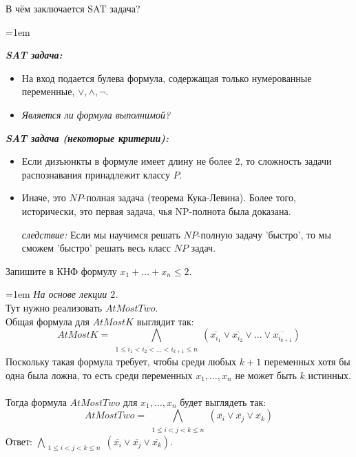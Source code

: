 \documentclass[12pt]{extreport}
\theoremstyle{definiton}
\theoremstyle{definition}
\theoremstyle{definition}
\let\leq\leqslant
\newcommand{\solution}[2][\color{myblue}Ответ]{
\medskip
	\noindent{\bfseries #1 }{{\color{myblue}\bfseries #2:}}
}
\newenvironment{blockquote}{%
  \par%
  \medskip
  \leftskip=1em%
  \noindent}{%
  \par\medskip}
\begin{document}
\Pr[\textcolor{mygreen}{Паша, DONE}] В чём заключается SAT задача?
			
\solution{3}
\begin{blockquote}
{\color{myblue}
\textbf{\textit{SAT задача:}}

\begin{itemize}
    \item На вход подается булева формула, содержащая только нумерованные переменные, $\lor, \land, \neg$. 
    \item \textit{Является ли формула выполнимой?}
\end{itemize}
\newpage\textbf{\textit{SAT задача (некоторые критерии):}}
\begin{itemize}
    \item Если дизъюнкты в формуле имеет длину не более 2, то сложность задачи распознавания принадлежит классу $P$.
    \item Иначе, это $NP$-полная задача (теорема Кука-Левина). Более того, исторически, это первая задача, чья NP-полнота была доказана.
    \item[\textit{следствие:}] Если мы научимся решать $NP$-полную задачу 'быстро', то мы сможем 'быстро' решать весь класс $NP$ задач.
\end{itemize}



}
\end{blockquote}

\Pr[\textcolor{mygreen}{Саит, DONE}] Запишите в КНФ формулу $x_1 + \dots + x_n \leq 2$.
			
\solution{4}
\begin{blockquote}
{\color{myblue}
\textcolor{mypurpur}{\textit{На основе лекции $2$.}}\\
\noindent Тут нужно реализовать $AtMostTwo$.\\
Общая формула для $AtMostK$ выглядит так:\\
$$AtMostK = {\bigwedge\limits_{\substack{1 \leq i_1 < i_2 < \dots < i_{k+1} \leq n}} (\overline{x_{i_1}} \vee \overline{x_{i_2}} \vee \ldots \vee \overline{x_{i_{k+1}}})}$$
Поскольку такая формула требует, чтобы среди любых $k + 1$ переменных хотя бы одна была ложна, то есть среди переменных $x_1, \dots, x_n$ не может быть $k$ истинных.\\
\\
Тогда формула $AtMostTwo$ для $x_1, \dots, x_n$ будет выглядеть так:
$$ AtMostTwo = {\bigwedge\limits_{\substack{1 \leq i < j < k \leq n}} (\overline{x_{i}} \vee \overline{x_{j}} \vee \overline{x_{k}})}$$
\textcolor{mygreen}{Ответ: ${\bigwedge\limits_{\substack{1 \leq i < j < k \leq n}} (\overline{x_{i}} \vee \overline{x_{j}} \vee \overline{x_{k}})}$.}
}
\end{blockquote}
\end{document}

